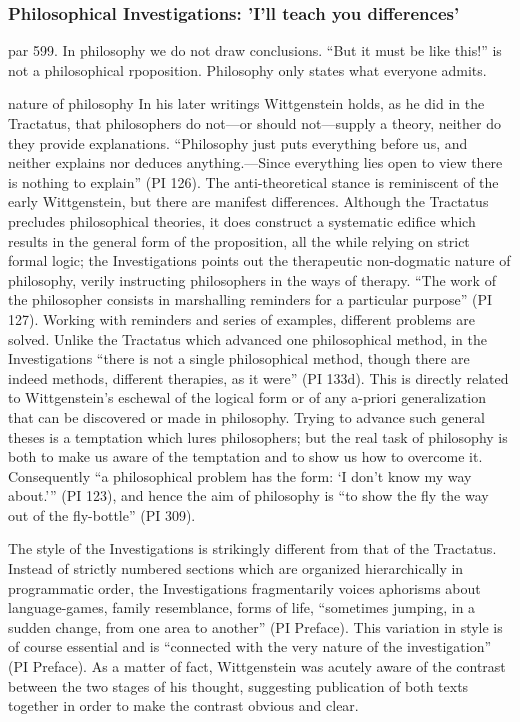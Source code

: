 \documentclass[../main.tex]{subfiles}
\begin{document}
\subsubsection{Philosophical Investigations: 'I'll teach you differences'}
par 599. In philosophy we do not draw conclusions. ``But it must be like this!'' is not a philosophical rpoposition. Philosophy only states what everyone admits.

nature of philosophy
In his later writings Wittgenstein holds, as he did in the Tractatus, that philosophers do not—or should not—supply a theory, neither do they provide explanations. “Philosophy just puts everything before us, and neither explains nor deduces anything.—Since everything lies open to view there is nothing to explain” (PI 126). The anti-theoretical stance is reminiscent of the early Wittgenstein, but there are manifest differences. Although the Tractatus precludes philosophical theories, it does construct a systematic edifice which results in the general form of the proposition, all the while relying on strict formal logic; the Investigations points out the therapeutic non-dogmatic nature of philosophy, verily instructing philosophers in the ways of therapy. “The work of the philosopher consists in marshalling reminders for a particular purpose” (PI 127). Working with reminders and series of examples, different problems are solved. Unlike the Tractatus which advanced one philosophical method, in the Investigations “there is not a single philosophical method, though there are indeed methods, different therapies, as it were” (PI 133d). This is directly related to Wittgenstein's eschewal of the logical form or of any a-priori generalization that can be discovered or made in philosophy. Trying to advance such general theses is a temptation which lures philosophers; but the real task of philosophy is both to make us aware of the temptation and to show us how to overcome it. Consequently “a philosophical problem has the form: ‘I don't know my way about.’” (PI 123), and hence the aim of philosophy is “to show the fly the way out of the fly-bottle” (PI 309).

The style of the Investigations is strikingly different from that of the Tractatus. Instead of strictly numbered sections which are organized hierarchically in programmatic order, the Investigations fragmentarily voices aphorisms about language-games, family resemblance, forms of life, “sometimes jumping, in a sudden change, from one area to another” (PI Preface). This variation in style is of course essential and is “connected with the very nature of the investigation” (PI Preface). As a matter of fact, Wittgenstein was acutely aware of the contrast between the two stages of his thought, suggesting publication of both texts together in order to make the contrast obvious and clear.
\end{document}
